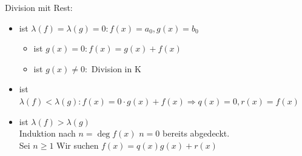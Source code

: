 \documentclass{article}
\begin{document}
\begin{itemize}
        Division mit Rest:\\
        \begin{itemize}
            \item
                ist $\lambda(f)=\lambda(g)=0:f(x)=a_0,
                g(x)=b_0$
                \begin{itemize}
                    \item
                        ist $g(x)=0:f(x)=g(x)+f(x)$
                    \item
                        ist $g(x)\neq 0:$ Division in K
                \end{itemize}
            \item
                ist $\lambda(f)<\lambda(g):f(x)=
                0\cdot g(x)+f(x)\Rightarrow
                q(x)=0,r(x)=f(x)$
            \item
                ist $\lambda(f)>\lambda(g)$\\
                Induktion nach $n=\deg f(x)$
                $n=0$ bereits abgedeckt.\\
                Sei $n\geq 1$
                Wir suchen $f(x)=q(x)g(x)+r(x)$


\end{itemize}
\end{itemize}
\end{document}

